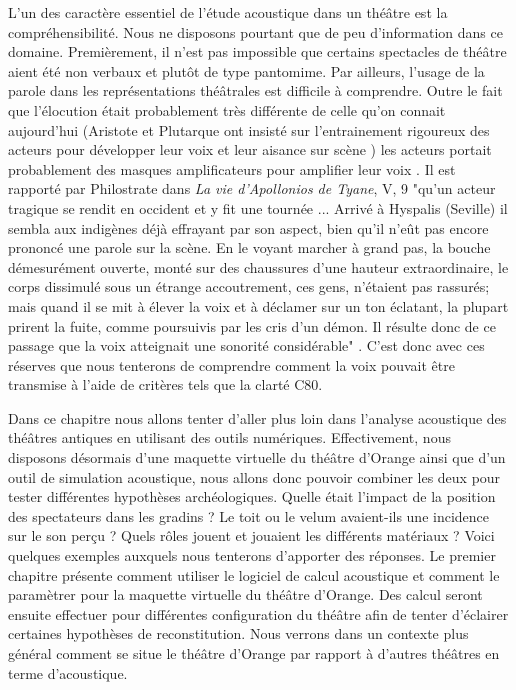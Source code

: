 L'un des caractère essentiel de l'étude acoustique dans un théâtre est la compréhensibilité. Nous ne disposons pourtant que de peu d'information dans ce domaine. Premièrement, il n'est pas impossible que certains spectacles de théâtre aient été non verbaux et plutôt de type pantomime. Par ailleurs, l'usage de la parole dans les représentations théâtrales est difficile à comprendre. Outre le fait que l'élocution était probablement très différente de celle qu'on connait aujourd'hui (Aristote \cite[Chap IV - XIV]{aristote} et Plutarque ont insisté sur l'entrainement rigoureux des acteurs pour développer leur voix et leur aisance sur scène \cite[p.39]{canac}) les acteurs portait probablement des masques amplificateurs pour amplifier leur voix \cite[p.362]{arnaud}. Il est rapporté par Philostrate dans \textit{La vie d'Apollonios de Tyane}, V, 9 "qu'un acteur tragique se rendit en occident et y fit une tournée ... Arrivé à Hyspalis (Seville) il sembla aux indigènes déjà effrayant par son aspect, bien qu'il n'eût pas encore prononcé une parole sur la scène. En le voyant marcher à grand pas, la bouche démesurément ouverte, monté sur des chaussures d'une hauteur extraordinaire, le corps dissimulé sous un étrange accoutrement, ces gens, n'étaient pas rassurés; mais quand il se mit à élever la voix et à déclamer sur un ton éclatant, la plupart prirent la fuite, comme poursuivis par les cris d'un démon. Il résulte donc de ce passage que la voix atteignait une sonorité considérable" \cite[p.43]{formige}. C'est donc avec ces réserves que nous tenterons de comprendre comment la voix pouvait être transmise à l'aide de critères tels que la clarté \gls{C80}.

Dans ce chapitre nous allons tenter d'aller plus loin dans l'analyse acoustique des théâtres antiques en utilisant des outils numériques. Effectivement, nous disposons désormais d'une maquette virtuelle du théâtre d'Orange ainsi que d'un outil de simulation acoustique, nous allons donc pouvoir combiner les deux pour tester différentes hypothèses archéologiques. Quelle était l'impact de la position des spectateurs dans les gradins ? Le toit ou le \gls{velum} avaient-ils une incidence sur le son perçu ? Quels rôles jouent et jouaient les différents matériaux ? Voici quelques exemples auxquels nous tenterons d'apporter des réponses. Le premier chapitre présente comment utiliser le logiciel de calcul acoustique et comment le paramètrer pour la maquette virtuelle du théâtre d'Orange. Des calcul seront ensuite effectuer pour différentes configuration du théâtre afin de tenter d'éclairer certaines hypothèses de reconstitution. Nous verrons dans un contexte plus général comment se situe le théâtre d'Orange par rapport à d'autres théâtres en terme d'acoustique.	
	

